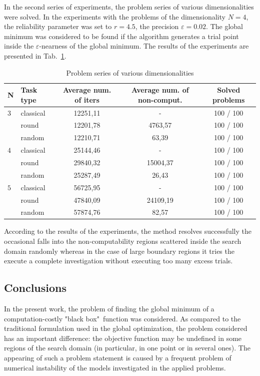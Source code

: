\documentclass[runningheads]{llncs}
\begin{document}
In the second series of experiments, the problem series of various dimensionalities were solved. In the experiments with the problems of the dimensionality $N=4$, the reliability parameter was set to $r=4.5$, the precision $\varepsilon=0.02$. The global minimum was considered to be found if the algorithm generates a trial point inside the $\varepsilon$-nearness of the global minimum. The results of the experiments are presented in Tab.~\ref{tab2}.

\begin{table}
\caption{Problem series of various dimensionalities}\label{tab2}
\begin{tabular}{|l|l|c|c|c|}
\hline
 N &  Task type & Average num. of iters & Average num. of non-comput. & Solved problems \\
\hline
$3$ & classical & 12251,11 & - & 100 / 100 \\
$ $ & round & 12201,78 & 4763,57 & 100 / 100 \\
$ $ & random & 12210,71 & 63,39 & 100 / 100 \\
\hline
$4$ & classical & 25144,46 & - & 100 / 100 \\
$ $ & round & 29840,32 & 15004,37  & 100 / 100 \\
$ $ & random & 25287,49 & 26,43 & 100 / 100 \\
\hline
$5$ & classical & 56725,95 & - & 100 / 100 \\
$ $ & round & 47840,09 & 24109,19 & 100 / 100\\
$ $ & random & 57874,76 & 82,57 & 100 / 100\\
\hline
\end{tabular}
\end{table}

According to the results of the experiments, the method resolves successfully the occasional falls into the non-computability regions scattered inside the search domain randomly whereas in the case of large boundary regions it tries the execute a complete investigation without executing too many excess trials.

\subsection{Conclusions}
In the present work, the problem of finding the global minimum of a computation-costly "black box"\ function was considered. As compared to the traditional formulation used in the global optimization, the problem considered has an important difference: the objective function may be undefined in some regions of the search domain (in particular, in one point or in several ones). The appearing of such a problem statement is caused by a frequent problem of numerical instability of the models investigated in the applied problems.
\end{document}
